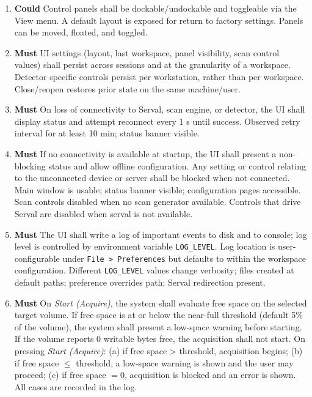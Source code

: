 \documentclass[10pt]{article}
\newcommand{\PriorityTag}[2]{%
  \colorbox{#2!25}{\footnotesize\textsf{\textbf{#1}}}\hspace{0.6em}}
\newcommand{\must}{\leavevmode\PriorityTag{Must}{green}}
\newcommand{\could}{\leavevmode\PriorityTag{Could}{cyan}}
\newcounter{reqgrp}[section] %
\newcounter{reqno}
\newcommand{\reqprefix}{GEN}
\newenvironment{requirements}[1]{%
  \renewcommand{\reqprefix}{#1}%
  \refstepcounter{reqgrp}%
  \setcounter{reqno}{0}%
  \begin{enumerate}[leftmargin=*]
}{\end{enumerate}}
\begin{document}
\begin{requirements}{UI}
  \item \could {}
  {Control panels shall be dockable/undockable and toggleable via the View menu. A default layout is exposed for return to factory settings. }
  {Panels can be moved, floated, and toggled.}

  \item \must {}
  {UI settings (layout, last workspace, panel visibility, scan control values) shall persist across sessions and at the granularity of a workspace. Detector specific controls persist per workstation, rather than per workspace.}
  {Close/reopen restores prior state on the same machine/user.}

  \item \must {}
  {On loss of connectivity to Serval, scan engine, or detector, the UI shall display status and attempt reconnect every 1 s until success.}
  {Observed retry interval for at least 10 min; status banner visible.}

  \item \must {}
  {If no connectivity is available at startup, the UI shall present a non-blocking status and allow offline configuration. Any setting or control relating to the unconnected device or server shall be blocked when not connected.}
  {Main window is usable; status banner visible; configuration pages accessible. Scan controls disabled when no scan generator available. Controls that drive Serval are disabled when serval is not available.}

  \item \must {}
  {The UI shall write a log of important events to disk and to console; log level is controlled by environment variable \texttt{LOG\_LEVEL}. Log location is user-configurable under \texttt{File > Preferences} but defaults to within the workspace configuration.}
  {Different \texttt{LOG\_LEVEL} values change verbosity; files created at default paths; preference overrides path; Serval redirection present.}

  \item \must {}
  {On \emph{Start (Acquire)}, the system shall evaluate free space on the selected target volume. If free space is at or below the near-full threshold (default 5\% of the volume), the system shall present a low-space warning before starting. If the volume reports 0 writable bytes free, the acquisition shall not start.}
  {On pressing \emph{Start (Acquire)}: (a) if free space > threshold, acquisition begins; (b) if free space \(\le\) threshold, a low-space warning is shown and the user may proceed; (c) if free space \(=0\), acquisition is blocked and an error is shown. All cases are recorded in the log.}


\end{requirements}
\end{document}
